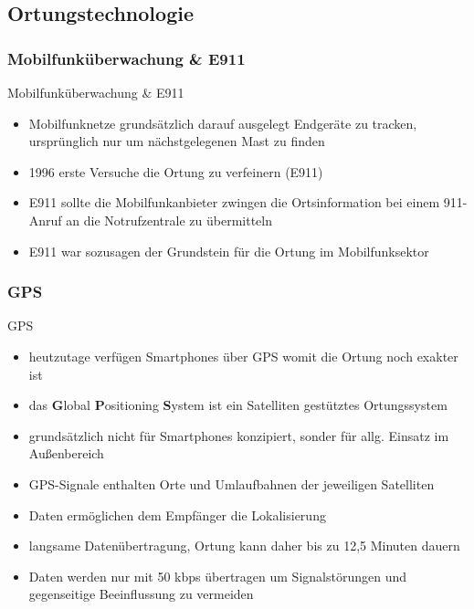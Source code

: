 \subsection{Ortungstechnologie}
\subsubsection{Mobilfunküberwachung \& E911}
\begin{frame}{Mobilfunküberwachung \& E911}
\begin{itemize}
  \item Mobilfunknetze grundsätzlich darauf ausgelegt Endgeräte zu tracken, ursprünglich nur um nächstgelegenen Mast zu finden
  \item 1996 erste Versuche die Ortung zu verfeinern (E911)
  \item E911 sollte die Mobilfunkanbieter zwingen die Ortsinformation bei einem 911-Anruf an die Notrufzentrale zu übermitteln
  \item E911 war sozusagen der Grundstein für die Ortung im Mobilfunksektor
\end{itemize}
\end{frame}

\subsubsection{GPS}
\begin{frame}{GPS}
\begin{itemize}
  \item heutzutage verfügen Smartphones über GPS womit die Ortung noch exakter ist
  \item das \textbf{G}lobal \textbf{P}ositioning \textbf{S}ystem ist ein Satelliten gestütztes Ortungssystem
  \item grundsätzlich nicht für Smartphones konzipiert, sonder für allg. Einsatz im Außenbereich
  \item GPS-Signale enthalten Orte und Umlaufbahnen der jeweiligen Satelliten
  \item Daten ermöglichen dem Empfänger die Lokalisierung
  \item langsame Datenübertragung, Ortung kann daher bis zu 12,5 Minuten dauern
  \item Daten werden nur mit 50 kbps übertragen um Signalstörungen und gegenseitige Beeinflussung zu vermeiden
\end{itemize}
\end{frame}

